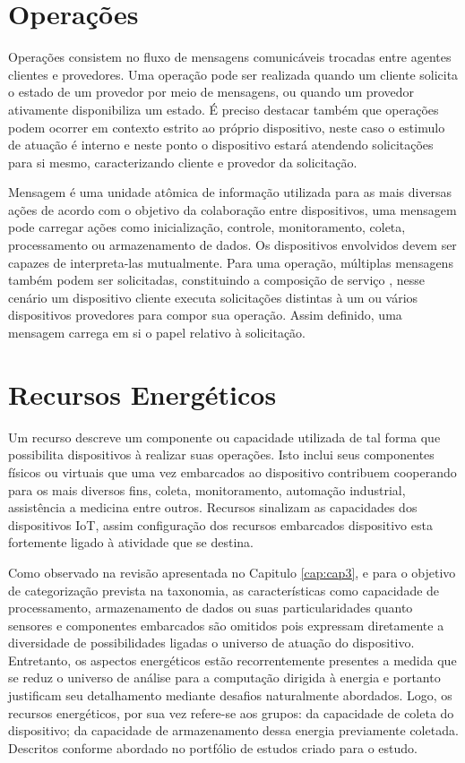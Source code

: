 \section{Operações}
Operações consistem no fluxo de mensagens comunicáveis trocadas entre agentes clientes e provedores. Uma operação pode ser realizada quando um cliente solicita o estado de um provedor por meio de mensagens, ou quando um provedor ativamente disponibiliza um estado. É preciso destacar também que operações podem ocorrer em contexto estrito ao próprio  dispositivo, neste caso o estimulo de atuação é interno e neste ponto o dispositivo estará atendendo solicitações para si mesmo, caracterizando cliente e provedor da solicitação.

Mensagem é uma unidade atômica de informação utilizada para as mais diversas ações de acordo com o objetivo da colaboração entre dispositivos, uma mensagem pode carregar ações como inicialização, controle, monitoramento, coleta, processamento ou armazenamento de dados. Os dispositivos envolvidos devem ser capazes de interpreta-las mutualmente. Para uma operação, múltiplas mensagens também podem ser solicitadas, constituindo a composição de serviço , nesse cenário um dispositivo cliente executa solicitações distintas à um ou vários dispositivos provedores para compor sua operação. Assim definido, uma mensagem carrega em si o papel relativo à solicitação. 



\section{Recursos Energéticos}

Um recurso descreve um componente ou capacidade utilizada de tal forma que possibilita dispositivos à realizar suas operações. Isto inclui seus componentes físicos ou virtuais que uma vez embarcados ao dispositivo contribuem cooperando para os mais diversos fins, coleta, monitoramento, automação industrial, assistência a medicina entre outros. Recursos sinalizam as capacidades dos dispositivos \acs{IoT}, assim configuração dos recursos embarcados dispositivo esta fortemente ligado à atividade que se destina. 

Como observado na revisão apresentada no Capitulo \ref{cap:cap3}, e para o objetivo de categorização prevista na taxonomia, as características como capacidade de processamento, armazenamento de dados ou suas particularidades quanto sensores e componentes embarcados são omitidos pois expressam diretamente a diversidade de possibilidades ligadas o universo de atuação do dispositivo. Entretanto, os aspectos energéticos estão recorrentemente presentes a medida que se reduz o universo de análise para a computação dirigida à energia e portanto justificam seu detalhamento mediante desafios naturalmente abordados. Logo, os recursos energéticos, por sua vez refere-se aos grupos: da capacidade de coleta do dispositivo; da capacidade de armazenamento dessa energia previamente coletada. Descritos conforme abordado no portfólio de estudos criado para o estudo. 

